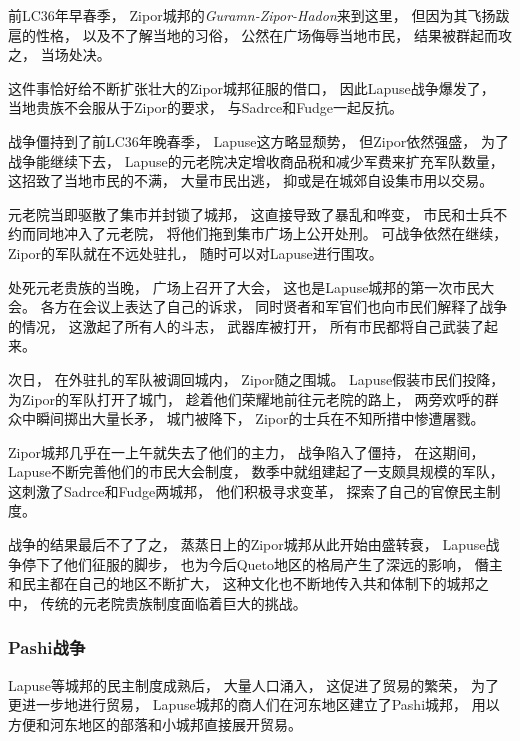 \documentclass[UTF8,12pt]{ctexbook}
\begin{document}
            前LC36年早春季，
            Zipor城邦的\emph{Guramn-Zipor-Hadon}来到这里，
            但因为其飞扬跋扈的性格，
            以及不了解当地的习俗，
            公然在广场侮辱当地市民，
            结果被群起而攻之，
            当场处决。

            这件事恰好给不断扩张壮大的Zipor城邦征服的借口，
            因此Lapuse战争爆发了，
            当地贵族不会服从于Zipor的要求，
            与Sadrce和Fudge一起反抗。

            战争僵持到了前LC36年晚春季，
            Lapuse这方略显颓势，
            但Zipor依然强盛，
            为了战争能继续下去，
            Lapuse的元老院决定增收商品税和减少军费来扩充军队数量，
            这招致了当地市民的不满，
            大量市民出逃，
            抑或是在城郊自设集市用以交易。

            元老院当即驱散了集市并封锁了城邦，
            这直接导致了暴乱和哗变，
            市民和士兵不约而同地冲入了元老院，
            将他们拖到集市广场上公开处刑。
            可战争依然在继续，
            Zipor的军队就在不远处驻扎，
            随时可以对Lapuse进行围攻。

            处死元老贵族的当晚，
            广场上召开了大会，
            这也是Lapuse城邦的第一次市民大会。
            各方在会议上表达了自己的诉求，
            同时贤者和军官们也向市民们解释了战争的情况，
            这激起了所有人的斗志，
            武器库被打开，
            所有市民都将自己武装了起来。

            次日，
            在外驻扎的军队被调回城内，
            Zipor随之围城。
            Lapuse假装市民们投降，
            为Zipor的军队打开了城门，
            趁着他们荣耀地前往元老院的路上，
            两旁欢呼的群众中瞬间掷出大量长矛，
            城门被降下，
            Zipor的士兵在不知所措中惨遭屠戮。

            Zipor城邦几乎在一上午就失去了他们的主力，
            战争陷入了僵持，
            在这期间，
            Lapuse不断完善他们的市民大会制度，
            数季中就组建起了一支颇具规模的军队，
            这刺激了Sadrce和Fudge两城邦，
            他们积极寻求变革，
            探索了自己的官僚民主制度。

            战争的结果最后不了了之，
            蒸蒸日上的Zipor城邦从此开始由盛转衰，
            Lapuse战争停下了他们征服的脚步，
            也为今后Queto地区的格局产生了深远的影响，
            僭主和民主都在自己的地区不断扩大，
            这种文化也不断地传入共和体制下的城邦之中，
            传统的元老院贵族制度面临着巨大的挑战。
            \subsubsection{Pashi战争}
            Lapuse等城邦的民主制度成熟后，
            大量人口涌入，
            这促进了贸易的繁荣，
            为了更进一步地进行贸易，
            Lapuse城邦的商人们在河东地区建立了Pashi城邦，
            用以方便和河东地区的部落和小城邦直接展开贸易。
\end{document}

